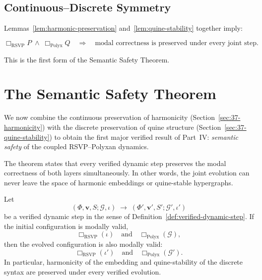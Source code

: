 \subsection{Continuous–Discrete Symmetry}

Lemmas~\ref{lem:harmonic-preservation} and~\ref{lem:quine-stability}
together imply:

\begin{equation}
\Box_{\mathrm{RSVP}} P
\;\wedge\;
\Box_{\mathrm{Polyx}} Q
\quad\Longrightarrow\quad
\text{modal correctness is preserved under every joint step}.
\label{eq:modal-joint-preservation}
\end{equation}

This is the first form of the Semantic Safety Theorem.

\section{The Semantic Safety Theorem}
\label{sec:37-semantic-safety}

We now combine the continuous preservation of harmonicity
(Section~\ref{sec:37-harmonicity}) with the discrete preservation
of quine structure (Section~\ref{sec:37-quine-stability}) to obtain
the first major verified result of Part~IV:
\emph{semantic safety} of the coupled RSVP--Polyxan dynamics.

The theorem states that every verified dynamic step preserves
the modal correctness of both layers simultaneously.  
In other words, the joint evolution can never leave the space of
harmonic embeddings or quine-stable hypergraphs.

\begin{theorem}
\label{thm:semantic-safety}
Let
\[
(\Phi,\mathbf{v},S;\mathcal{G},\iota)
\;\longrightarrow\;
(\Phi',\mathbf{v}',S';\mathcal{G}',\iota')
\]
be a verified dynamic step in the sense of
Definition~\ref{def:verified-dynamic-step}.
If the initial configuration is modally valid,
\[
\Box_{\mathrm{RSVP}}(\iota)
\quad\text{and}\quad
\Box_{\mathrm{Polyx}}(\mathcal{G}),
\]
then the evolved configuration is also modally valid:
\[
\Box_{\mathrm{RSVP}}(\iota')
\quad\text{and}\quad
\Box_{\mathrm{Polyx}}(\mathcal{G}').
\]
In particular, harmonicity of the embedding
and quine-stability of the discrete syntax
are preserved under every verified evolution.
\end{theorem}

